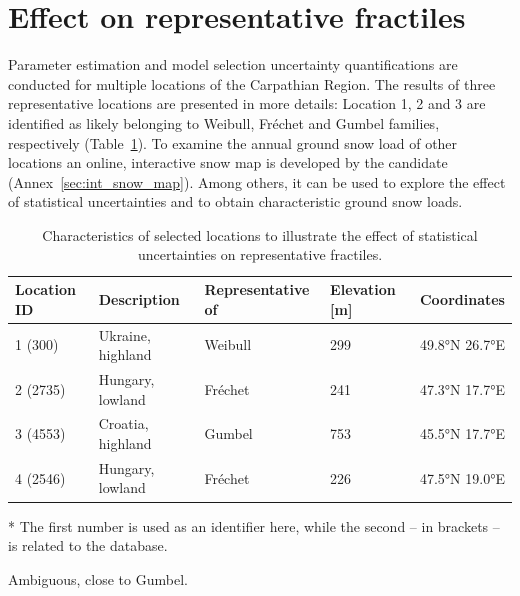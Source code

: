 %
%
%
%


\section{Effect on representative fractiles}
Parameter estimation and model selection uncertainty quantifications are conducted for multiple locations of the Carpathian Region. The results of three representative locations are presented in more details: Location 1, 2 and 3 are identified as likely belonging to Weibull, Fréchet and Gumbel families, respectively (Table~\ref{tab:loc_parmest}). To examine the annual ground snow load of other locations an online, interactive snow map is developed by the candidate (Annex~\ref{sec:int_snow_map}). Among others, it can be used to explore the effect of statistical uncertainties and to obtain characteristic ground snow loads.

\begin{table}[htbp!]
\caption{Characteristics of selected locations to illustrate the effect of statistical uncertainties on representative fractiles.}
\centering
\label{tab:loc_parmest}
\small
	\begin{threeparttable}
    \begin{tabular}{l l l l l}
    \toprule
    Location ID\tnote{*}  & Description & Representative of & Elevation [m] & Coordinates  \\
    \midrule
    \rowcolor{lightgrey} 1 (300)  & Ukraine, highland & Weibull & 299 & 49.8°N 26.7°E   \\
    2 (2735)  & Hungary, lowland & Fréchet & 241 & 47.3°N 17.7°E   \\
    \rowcolor{lightgrey} 3 (4553)  & Croatia, highland & Gumbel & 753 & 45.5°N 17.7°E   \\
    4 (2546)  & Hungary, lowland & Fréchet\tnote{\textdagger} & 226 & 47.5°N 19.0°E   \\
    \bottomrule
    \end{tabular}
    \begin{tablenotes}
        \item[*] The first number is used as an identifier here, while the second -- in brackets -- is related to the database.
        \item[\textdagger] Ambiguous, close to Gumbel.
    \end{tablenotes}
    \end{threeparttable}
\end{table}


